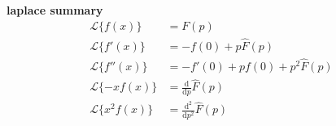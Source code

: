 \documentclass[a4paper]{article}
\begin{document}
\begin{multicols}{2}
\begin{framed}
	\noindent
	\textbf{laplace summary}
	\begin{align*}
		\mathcal{L}\{f(x)\} & = F(p)	\\
		\mathcal{L}\{f'(x)\} & = -f(0) +p\hat{F}(p)\\
		\mathcal{L}\{f''(x)\} & = -f'(0) + pf(0) + p^2\hat{F}(p)\\
		\mathcal{L}\{-xf(x)\} & = \frac{\mathrm{d}}{\mathrm{d}p} \hat{F}(p)\\
		\mathcal{L}\{x^2f(x)\} & = \frac{\mathrm{d}^2}{\mathrm{d}p^2} \hat{F}(p)
	\end{align*}
\end{framed}

\end{multicols}
\end{document}
